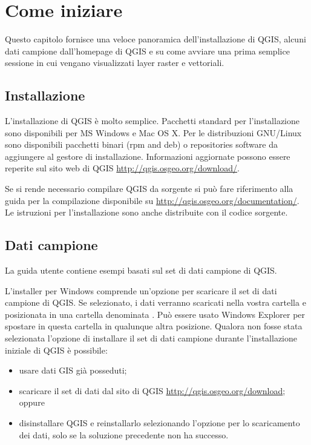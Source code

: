 
\section{Come iniziare}\label{label_getstarted}


Questo capitolo fornisce una veloce panoramica dell'installazione
di QGIS, alcuni dati campione dall'homepage di QGIS e su come avviare
una prima semplice sessione in cui vengano visualizzati layer raster
e vettoriali.

\subsection{Installazione}\label{label_installation}

L'installazione di QGIS è molto semplice. Pacchetti standard per l'installazione
sono disponibili per MS Windows e Mac OS X. Per le distribuzioni GNU/Linux
sono disponibili pacchetti binari (rpm and deb) o repositories software
da aggiungere al gestore di installazione. Informazioni aggiornate
possono essere reperite sul sito web di QGIS \url{http://qgis.osgeo.org/download/}.


Se si rende necessario compilare QGIS da sorgente si può fare riferimento alla guida 
per la compilazione disponibile su \url{http://qgis.osgeo.org/documentation/}.
Le istruzioni per l'installazione sono anche distribuite con il codice sorgente.

\subsection{Dati campione}\label{label_sampledata}

La guida utente contiene esempi basati sul set di dati campione di
QGIS.

\win L'installer per Windows comprende un'opzione per scaricare il
set di dati campione di QGIS. Se selezionato, i dati verranno scaricati
nella vostra cartella  e posizionata in
una cartella denominata . Può essere usato
Windows Explorer per spostare in questa cartella in qualunque altra
posizione. Qualora non fosse stata selezionata l'opzione di installare
il set di dati campione durante l'installazione iniziale di QGIS è
possibile: 
\begin{itemize}
\item usare dati GIS già posseduti; 
\item scaricare il set di dati dal sito di QGIS \url{http://qgis.osgeo.org/download};
oppure 
\item disinstallare QGIS e reinstallarlo selezionando l'opzione per lo scaricamento
dei dati, solo se la soluzione precedente non ha successo. 
\end{itemize}

